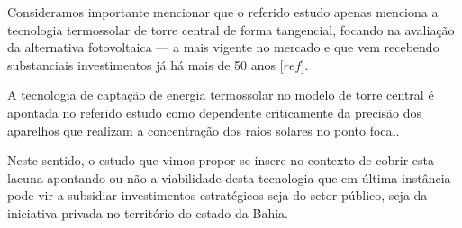 Consideramos importante mencionar que o referido estudo apenas menciona a
tecnologia termossolar de torre central de forma tangencial, focando na
avaliação da alternativa fotovoltaica --- a mais vigente no mercado e que vem
recebendo substanciais investimentos já há mais de 50 anos [$ref$].

A tecnologia de captação de energia termossolar no modelo de torre central é
apontada no referido estudo como dependente criticamente da precisão dos
aparelhos que realizam a concentração dos raios solares no ponto focal.

Neste sentido, o estudo que vimos propor se insere no contexto de cobrir esta
lacuna apontando ou não a viabilidade desta tecnologia que em última instância
pode vir a subsidiar investimentos estratégicos seja do setor público, seja da
iniciativa privada no território do estado da Bahia.
